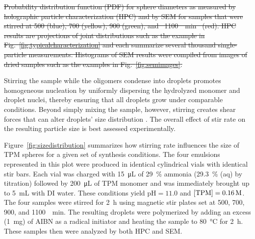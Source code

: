 \documentclass[journal=langd5,manuscript=article]{achemso}
\providecommand{\DIFadd}[1]{{\protect\color{blue}\uwave{#1}}} %
\providecommand{\DIFdel}[1]{{\protect\color{red}\sout{#1}}}                      %
\providecommand{\DIFaddbegin}{} %
\providecommand{\DIFaddend}{} %
\providecommand{\DIFdelbegin}{} %
\providecommand{\DIFdelend}{} %
\providecommand{\DIFdelFL}[1]{\DIFdel{#1}} %
\begin{document}
\DIFdelbegin %
{%
\DIFdelFL{Probability distribution function (PDF) for 
    sphere diameters as measured by
    holographic particle characterization (HPC) and by SEM for
    samples that were stirred at 
    \num{500} (blue), 
    \num{700} (yellow), 
    \num{900} (green), 
    and \mbox{%
\SI{1100}{\per\minute} }\hspace{0pt}%
(red).
    HPC results are projections of joint
    distributions such as the example in
    Fig.~\ref{fig:typicalcharacterization}
    and each summarize several thousand single-particle measurements.
    Histograms of SEM results were compiled from
    images of dried samples such as the
    examples in Fig.~\ref{fig:semimages}.}}

\DIFdelend Stirring the sample while the oligomers condense into droplets promotes
homogeneous nucleation by uniformly dispersing the hydrolyzed monomer
and droplet nuclei, thereby ensuring that all droplets grow under
comparable conditions.
Beyond simply mixing the sample, however, stirring creates shear
forces \cite{halasz2007vortex} that can alter droplets' size
distribution \cite{oles1992shear,eggersdorfer2010fragmentation}.
The overall effect of stir rate on the resulting particle size
is best assessed experimentally.

Figure~\ref{fig:sizedistribution} summarizes how
stirring rate influences the size
of TPM spheres for a given set of synthesis conditions.
The four emulsions represented in this plot
were produced in identical cylindrical 
vials with identical stir bars. 
Each vial was charged with
\SI{15}{\micro\liter} of \SI{29}{\percent} ammonia 
(\SI{29.3}{\percent} (aq) by  titration) 
\DIFaddbegin \DIFadd{using an Eppendorf Research plus pipette, }\DIFaddend followed by
\SI{200}{\micro\liter} of TPM monomer and was immediately
brought up to \SI{5}{\milli\liter} with DI water.
These conditions yield $\text{pH} = \num{11.0}$ and
$[\ce{TPM}] = \SI{0.16}{M}$.
The four samples were stirred for \SI{2}{\hour}
using magnetic stir plates set at \num{500}, \num{700}, \num{900}, and
\SI{1100}{\per\minute}. 
The resulting droplets were polymerized by adding an excess (\SI{1}{mg}) of AIBN
as a radical initiator and
heating the sample to \SI{80}{\celsius} for \SI{2}{\hour}.
These samples then were analyzed by both HPC and SEM.
\end{document}
